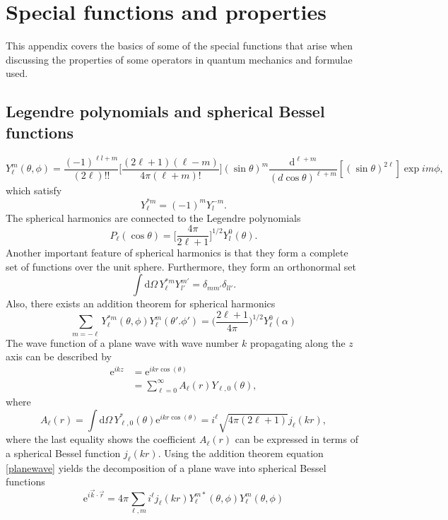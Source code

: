 \chapter{Special functions and properties}
This appendix covers the basics of some of the special functions that arise when discussing the properties of some operators in quantum mechanics and formulae used.
\section{Legendre polynomials and spherical Bessel functions}\label{app:Bessel}
\begin{equation}
	Y_{\ell}^m(\theta,\phi) = \frac{(-1)^{{\ell}l+m}}{(2\ell)!!}\bigg[ \frac{(2\ell+1)(\ell-m)}{4\pi(\ell+m)!}\bigg](\sin\theta)^m\frac{\text{d}^{\ell+m}}{(d\cos\theta)^{\ell+m}}[(\sin\theta)^{2\ell}]\exp{i m\phi},
\end{equation}
which satisfy
\begin{equation}
	Y_\ell^{*m}=(-1)^m Y_{l}^{-m}.
\end{equation}
The spherical harmonics are connected to the Legendre polynomials
\begin{equation}
	P_\ell(\cos\theta) = \big[ \frac{4\pi}{2\ell+1} \big]^{1/2}Y_{l}^0(\theta).
\end{equation}
Another important feature of spherical harmonics is that they form a complete set of functions over the unit sphere. Furthermore, they form an orthonormal set
\begin{equation}\label{orthset}
	\int \text{d}\Omega \, Y_\ell^{*m} Y_{l'}^{m'} = \delta_{mm'}\delta_{ll'}.
\end{equation}
Also, there exists an addition theorem for spherical harmonics
\begin{equation}\label{addition}
	\sum_{m=-\ell} Y_\ell^{*m}(\theta,\phi)Y_\ell^{m}(\theta'.\phi') = \bigg( \frac{2\ell+1}{4\pi}\bigg)^{1/2}Y_\ell^0(\alpha)
\end{equation}
The wave function of a plane wave with wave number $k$ propagating along the $z$ axis can be described by
\begin{align} \label{planewave}
	\text{e}^{ikz}  &= \text{e}^{ikr \cos(\theta)}  \\
	&= \sum_{\ell=0}^\infty A_\ell(r)Y_{\ell,0}(\theta),
\end{align}
where
\begin{equation} \label{besselcoef}
	A_\ell(r) = \int \text{d}\Omega \, Y_{\ell,0}^*(\theta)\text{e}^{ikr\cos(\theta)}  = i^\ell\sqrt{4\pi(2\ell+1)}j_\ell(kr),
\end{equation}
where the last equality shows the coefficient $A_\ell(r)$ can be expressed in terms of a spherical Bessel function $j_\ell(kr)$. Using the addition theorem equation \eqref{planewave} yields the decomposition of a plane wave into spherical Bessel functions
\begin{equation} \label{sphericalbesseldecomp}
	\text{e}^{i\vec{k}\cdot\vec{r}} = 4\pi \sum_{\ell,m}i^\ell j_\ell(kr)Y_\ell^{m*}(\theta,\phi)Y_\ell^{m}(\theta,\phi)
\end{equation}
